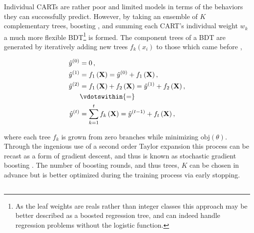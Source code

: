 Individual CARTs are rather poor and limited models
in terms of the behaviors they can successfully predict.
However, by taking an ensemble of $K$ complementary trees, \ie boosting \cite{FREUND1997119,friedman2000},
and summing each CART's individual weight $w_{k}$ a much more flexible BDT\footnote{As the leaf weights
are reals rather than integer classes this approach may be better described as a boosted regression tree,
and can indeed handle regression problems without the logistic function.} is formed.
The component trees of a BDT are generated by iteratively adding new trees $f_{k}\left(x_{i}\right)$ to those which came before \cite{XGBoost},

\begin{equation} \label{eq:boosting}
\begin{aligned}
\hat{y}^{\left(0\right)} &= 0\,, \\
\hat{y}^{\left(1\right)} &= f_1\left(\mathbf{X}\right) = \hat{y}^{\left(0\right)} + f_1\left(\mathbf{X}\right), \\
\hat{y}^{\left(2\right)} &= f_1\left(\mathbf{X}\right) + f_2\left(\mathbf{X}\right)= \hat{y}^{\left(1\right)} + f_2\left(\mathbf{X}\right), \\
                           &\vdotswithin{\displaystyle =} \\
\hat{y}^{\left(t\right)} &= \sum_{k=1}^t f_k\left(\mathbf{X}\right)= \hat{y}^{\left(t-1\right)} + f_t\left(\mathbf{X}\right),
\end{aligned}
\end{equation}

\noindent where each tree $f_{k}$ is grown from zero branches while minimizing $\text{obj}\left(\theta\right)$.
Through the ingenious use of a second order Taylor expansion this process can
be recast as a form of gradient descent, and thus is known as
stochastic gradient boosting \cite{10.2307/2699986,FRIEDMAN2002367}.
The number of boosting rounds, and thus trees, $K$ can be chosen in advance
but is better optimized during the training process via early stopping.

\subsection{\xgboost}%
\label{ml:supervised:BDT:xgboost}


